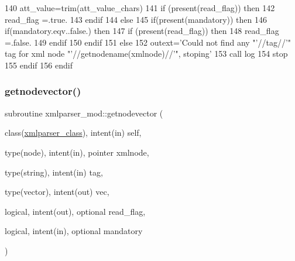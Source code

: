 \begin{DoxyCode}
140         att\_value=trim(att\_value\_chars)
141         \textcolor{keywordflow}{if} (\textcolor{keyword}{present}(read\_flag)) \textcolor{keywordflow}{then}
142             read\_flag =.true.
143 \textcolor{keywordflow}{        endif}
144     \textcolor{keywordflow}{else}
145         \textcolor{keywordflow}{if}(\textcolor{keyword}{present}(mandatory)) \textcolor{keywordflow}{then}
146             \textcolor{keywordflow}{if}(mandatory.eqv..false.) \textcolor{keywordflow}{then}
147                 \textcolor{keywordflow}{if} (\textcolor{keyword}{present}(read\_flag)) \textcolor{keywordflow}{then}
148                     read\_flag =.false.
149 \textcolor{keywordflow}{                endif}
150 \textcolor{keywordflow}{            endif}
151         \textcolor{keywordflow}{else}
152             outext=\textcolor{stringliteral}{'Could not find any "'}//tag//\textcolor{stringliteral}{'" tag for xml node "'}//getnodename(xmlnode)//\textcolor{stringliteral}{'", stoping'}
153             \textcolor{keyword}{call }log%
154             stop
155 \textcolor{keywordflow}{        endif}
156 \textcolor{keywordflow}{    endif}
\end{DoxyCode}
\mbox{\label{namespacexmlparser__mod_a0c2ac0513cee4e660e07cb083a790a53}} 
\subsubsection{\texorpdfstring{getnodevector()}{getnodevector()}}
{\footnotesize\ttfamily subroutine xmlparser\+\_\+mod\+::getnodevector (\begin{DoxyParamCaption}\item[{class(\mbox{\hyperlink{structxmlparser__mod_1_1xmlparser__class}{xmlparser\+\_\+class}}), intent(in)}]{self,  }\item[{type(node), intent(in), pointer}]{xmlnode,  }\item[{type(string), intent(in)}]{tag,  }\item[{type(vector), intent(out)}]{vec,  }\item[{logical, intent(out), optional}]{read\+\_\+flag,  }\item[{logical, intent(in), optional}]{mandatory }\end{DoxyParamCaption})\hspace{0.3cm}{\ttfamily [private]}}



